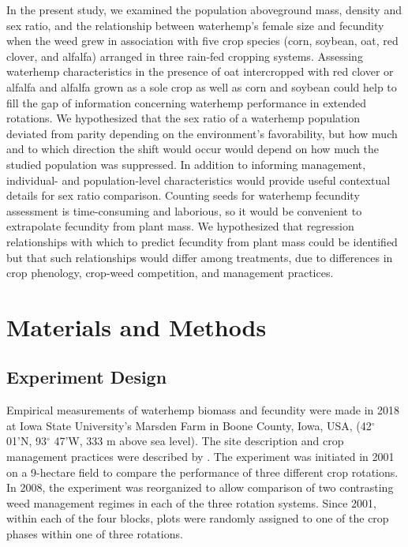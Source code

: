\documentclass[
]{article}
\begin{document}
In the present study, we examined the population aboveground mass, density and sex ratio, and the relationship between waterhemp's female size and fecundity when the weed grew in association with five crop species (corn, soybean, oat, red clover, and alfalfa) arranged in three rain-fed cropping systems. Assessing waterhemp characteristics in the presence of oat intercropped with red clover or alfalfa and alfalfa grown as a sole crop as well as corn and soybean could help to fill the gap of information concerning waterhemp performance in extended rotations. We hypothesized that the sex ratio of a waterhemp population deviated from parity depending on the environment's favorability, but how much and to which direction the shift would occur would depend on how much the studied population was suppressed. In addition to informing management, individual- and population-level characteristics would provide useful contextual details for sex ratio comparison. Counting seeds for waterhemp fecundity assessment is time-consuming and laborious, so it would be convenient to extrapolate fecundity from plant mass. We hypothesized that regression relationships with which to predict fecundity from plant mass could be identified but that such relationships would differ among treatments, due to differences in crop phenology, crop-weed competition, and management practices.

\hypertarget{materials-and-methods}{%
\section*{Materials and Methods}\label{materials-and-methods}}

\hypertarget{experiment-design}{%
\subsection*{Experiment Design}\label{experiment-design}}

Empirical measurements of waterhemp biomass and fecundity were made in 2018 at Iowa State University's Marsden Farm in Boone County, Iowa, USA, (42\(^\circ\) 01'N, 93\(^\circ\) 47'W, 333 m above sea level). The site description and crop management practices were described by \citet{liebmanWeedSeedbankDiversity2021}. The experiment was initiated in 2001 on a 9-hectare field to compare the performance of three different crop rotations. In 2008, the experiment was reorganized to allow comparison of two contrasting weed management regimes in each of the three rotation systems. Since 2001, within each of the four blocks, plots were randomly assigned to one of the crop phases within one of three rotations. 
\end{document}
